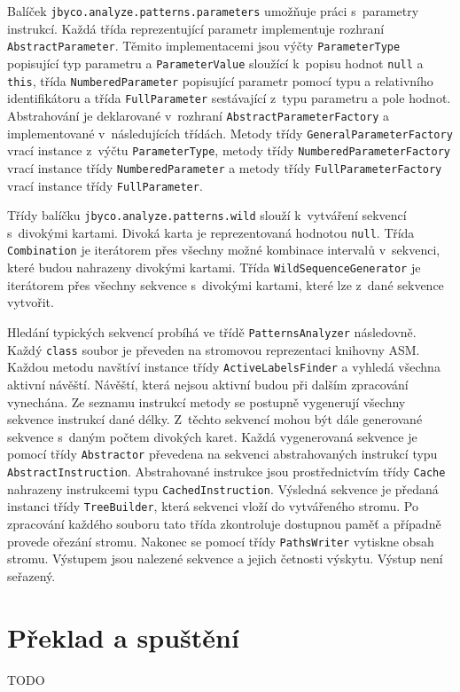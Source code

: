 Balíček \texttt{jbyco.analyze.patterns.parameters} umožňuje práci s~parametry instrukcí. Každá třída reprezentující parametr implementuje rozhraní \texttt{AbstractParameter}. Těmito implementacemi jsou výčty \texttt{ParameterType} popisující typ parametru a \texttt{ParameterValue} sloužící k~popisu hodnot \texttt{null} a \texttt{this}, třída \texttt{NumberedParameter} popisující parametr pomocí typu a relativního identifikátoru a třída \texttt{FullParameter} sestávající z~typu parametru a pole hodnot. Abstrahování je deklarované v~rozhraní \texttt{AbstractParameterFactory} a implementované v~následujících třídách. Metody třídy \texttt{GeneralParameterFactory} vrací instance z~výčtu \texttt{ParameterType}, metody třídy \texttt{NumberedParameterFactory} vrací instance třídy \texttt{NumberedParameter} a metody třídy \texttt{FullParameterFactory} vrací instance třídy \texttt{FullParameter}.

Třídy balíčku \texttt{jbyco.analyze.patterns.wild} slouží k~vytváření sekvencí s~divokými kartami. Divoká karta je reprezentovaná hodnotou \texttt{null}. Třída \texttt{Combination} je iterátorem přes všechny možné kombinace intervalů v~sekvenci, které budou nahrazeny divokými kartami. Třída \texttt{WildSequenceGenerator} je iterátorem přes všechny sekvence s~divokými kartami, které lze z~dané sekvence vytvořit.

Hledání typických sekvencí probíhá ve třídě \texttt{PatternsAnalyzer} následovně. Každý \texttt{class} soubor je převeden na stromovou reprezentaci knihovny ASM. Každou metodu navštíví instance třídy \texttt{ActiveLabelsFinder} a vyhledá všechna aktivní návěští. Návěští, která nejsou aktivní budou při dalším zpracování vynechána. Ze seznamu instrukcí metody se postupně vygenerují všechny sekvence instrukcí dané délky. Z~těchto sekvencí mohou být dále generované sekvence s~daným počtem divokých karet. Každá vygenerovaná sekvence je pomocí třídy \texttt{Abstractor} převedena na sekvenci abstrahovaných instrukcí typu \texttt{AbstractInstruction}. Abstrahované instrukce jsou prostřednictvím třídy \texttt{Cache} nahrazeny instrukcemi typu \texttt{CachedInstruction}. Výsledná sekvence je předaná instanci třídy \texttt{TreeBuilder}, která sekvenci vloží do vytvářeného stromu. Po zpracování každého souboru tato třída zkontroluje dostupnou paměť a případně provede ořezání stromu. Nakonec se pomocí třídy \texttt{PathsWriter} vytiskne obsah stromu. Výstupem jsou nalezené sekvence a jejich četnosti výskytu. Výstup není seřazený.

\section{Překlad a spuštění}\label{ToolRun}

TODO

